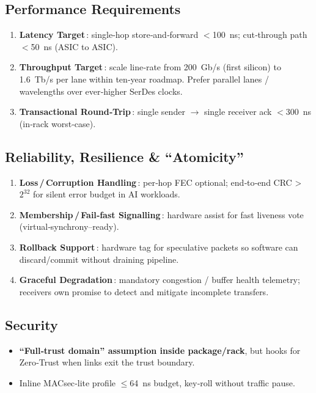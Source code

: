 \subsection{Performance Requirements}
\begin{enumerate}%
  \item \textbf{Latency Target}\,: single‑hop store‑and‑forward $<$100 ns; cut‑through path $<$50 ns (ASIC to ASIC).  
  \item \textbf{Throughput Target}\,: scale line‑rate from 200 Gb/s (first silicon) to 1.6 Tb/s per lane within ten‑year roadmap.  
        Prefer parallel lanes / wavelengths over ever‑higher SerDes clocks.  
  \item \textbf{Transactional Round‑Trip}\,: single sender $\rightarrow$ single receiver ack $<$300 ns (in‑rack worst‑case).
\end{enumerate}

\subsection{Reliability, Resilience \& “Atomicity”}
\begin{enumerate}%
  \item \textbf{Loss\,/\,Corruption Handling}\,: per‑hop FEC optional; end‑to‑end CRC \textgreater\,$2^{32}$ for silent error budget in AI workloads.  
  \item \textbf{Membership\,/\,Fail‑fast Signalling}\,: hardware assist for fast liveness vote (virtual‑synchrony–ready).  
  \item \textbf{Rollback Support}\,: hardware tag for speculative packets so software can discard/commit without draining pipeline.  
  \item \textbf{Graceful Degradation}\,: mandatory congestion / buffer health telemetry; receivers own promise to detect and mitigate incomplete transfers.
\end{enumerate}

\subsection{Security}
\begin{itemize}
  \item \textbf{“Full‑trust domain” assumption inside package/rack}, but hooks for Zero‑Trust when links exit the trust boundary.  
  \item Inline MACsec‑lite profile $\le$64 ns budget, key‑roll without traffic pause.
\end{itemize}

